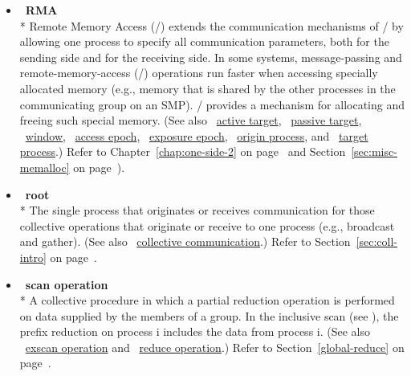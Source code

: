 \begin{itemize}
\label{glossary:RMA}
\item  ~\hypertarget{glossary:RMA}{\textbf{RMA}} \\*
Remote Memory Access (\RMA/) extends the communication mechanisms of \MPI/ by
allowing one process to specify all communication parameters, both for
the sending side and for the receiving side.
In some systems, message-passing and remote-memory-access (\RMA/) operations
run faster when accessing specially allocated memory (e.g., memory that is
shared by the other processes in the communicating group on an SMP).  \MPI/
provides a mechanism for allocating and freeing such special memory.  
(See also ~\hyperlink{glossary:active_target}{active target},
~\hyperlink{glossary:passive_target}{passive target},
~\hyperlink{glossary:window}{window},
~\hyperlink{glossary:access_epoch}{access epoch},
~\hyperlink{glossary:exposure_epoch}{exposure epoch},
~\hyperlink{glossary:origin_process}{origin process},
and ~\hyperlink{glossary:target_process}{target process}.)
Refer to Chapter~\ref{chap:one-side-2} on page~\pageref{chap:one-side-2}
and Section~\ref{sec:misc-memalloc} on page~\pageref{sec:misc-memalloc}).

\label{glossary:root}
\item  ~\hypertarget{glossary:root}{\textbf{root}} \\*
The single process that originates or receives communication for those collective
operations that originate or receive to one process (e.g., broadcast and gather). 
(See also ~\hyperlink{glossary:collective_communication}{collective communication}.)
Refer to Section~\ref{sec:coll-intro} on page~\pageref{sec:coll-intro}.

\label{glossary:scan_operation}
\item  ~\hypertarget{glossary:scan_operation}{\textbf{scan operation}} \\*
A collective procedure in which a partial reduction operation is performed on data supplied by the members of a group.
In the inclusive scan (see ), the prefix reduction on process i includes the data from process i. 
(See also ~\hyperlink{glossary:exscan_operation}{exscan operation} and
~\hyperlink{glossary:reduce_operation}{reduce operation}.)
Refer to Section~\ref{global-reduce} on page~\pageref{global-reduce}.


\end{itemize}
